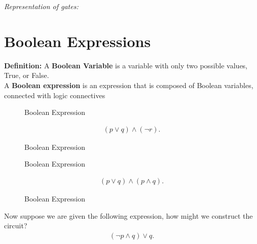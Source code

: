 \documentclass{report}
\begin{document}
    \pagebreak \bigbreak \noindent 
    \textit{Representation of gates:}
    \bigbreak \noindent 
\begin{figure}[ht]
    \centering
    \label{fig:icry2}
\end{figure}

    \bigbreak \noindent \bigbreak \noindent 
    \section{Boolean Expressions}
    \bigbreak \noindent 
    \begin{mdframed}
        \textbf{Definition:}
        A \textbf{Boolean Variable} is a variable with only two possible values, True, or False. \\
       A \textbf{Boolean expression} is an expression that is composed of Boolean variables, connected with logic connectives
    \end{mdframed}
    \bigbreak \noindent 
\begin{figure}[ht]
    \begin{minipage}{0.5\textwidth}
        \centering
        \caption{Boolean Expression}
        \label{fig:booleanfig}
    \end{minipage}
    \begin{minipage}{0.47\textwidth}
        \begin{align*}
            (p \lor q) \land (\neg r)
        .\end{align*}
    \caption{Boolean Expression}
    \label{fig:booleanfig}
    \end{minipage}
\end{figure}

    \pagebreak \bigbreak \noindent 

\begin{figure}[ht]

    \begin{minipage}{0.47\textwidth}
        \centering
        \caption{Boolean Expression}
        \label{fig:booleanfig23}
    \end{minipage}
    \begin{minipage}{0.47\textwidth}
    \begin{align*}
        (p\lor q) \land (p \land q)
    .\end{align*}
    \caption{Boolean Expression}
    \label{fig:booleanfig23}
    \end{minipage}
\end{figure}
    \bigbreak \noindent 
    Now suppose we are given the following expression, how might we construct the circuit?
    \begin{align*}
        (\neg p  \land q)  \lor q
    .\end{align*}
    \bigbreak \noindent 
\begin{figure}[ht]
    \centering
    \label{fig:booleanmagic}
\end{figure}
    
\end{document}
